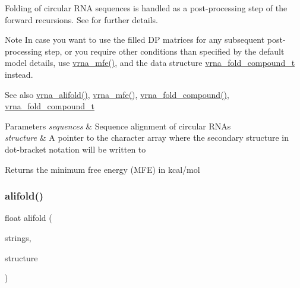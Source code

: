 Folding of circular R\+NA sequences is handled as a post-\/processing step of the forward recursions. See \cite{hofacker:2006} for further details.

\begin{DoxyNote}{Note}
In case you want to use the filled DP matrices for any subsequent post-\/processing step, or you require other conditions than specified by the default model details, use \mbox{\hyperlink{group__mfe__fold_gabd3b147371ccf25c577f88bbbaf159fd}{vrna\+\_\+mfe()}}, and the data structure \mbox{\hyperlink{group__fold__compound_ga1b0cef17fd40466cef5968eaeeff6166}{vrna\+\_\+fold\+\_\+compound\+\_\+t}} instead.
\end{DoxyNote}
\begin{DoxySeeAlso}{See also}
\mbox{\hyperlink{group__consensus__mfe__fold_ga6c9d3bef3e92c6d423ffac9f981418c1}{vrna\+\_\+alifold()}}, \mbox{\hyperlink{group__mfe__fold_gabd3b147371ccf25c577f88bbbaf159fd}{vrna\+\_\+mfe()}}, \mbox{\hyperlink{group__fold__compound_ga6601d994ba32b11511b36f68b08403be}{vrna\+\_\+fold\+\_\+compound()}}, \mbox{\hyperlink{group__fold__compound_ga1b0cef17fd40466cef5968eaeeff6166}{vrna\+\_\+fold\+\_\+compound\+\_\+t}}
\end{DoxySeeAlso}

\begin{DoxyParams}{Parameters}
{\em sequences} & Sequence alignment of circular R\+N\+As \\
\hline
{\em structure} & A pointer to the character array where the secondary structure in dot-\/bracket notation will be written to \\
\hline
\end{DoxyParams}
\begin{DoxyReturn}{Returns}
the minimum free energy (M\+FE) in kcal/mol 
\end{DoxyReturn}
\mbox{\label{group__consensus__mfe__fold_ga4cf00f0659e5f0480335d69e797f05b1}} 
\subsubsection{\texorpdfstring{alifold()}{alifold()}}
{\footnotesize\ttfamily float alifold (\begin{DoxyParamCaption}\item[{const char $\ast$$\ast$}]{strings,  }\item[{char $\ast$}]{structure }\end{DoxyParamCaption})}




